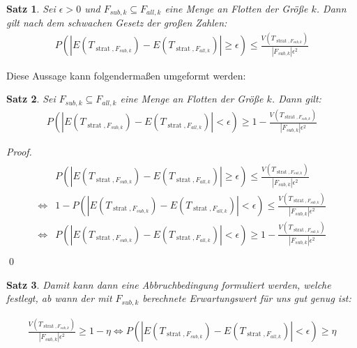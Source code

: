 \documentclass[a4paper,12pt]{llncs}
\numberwithin{equation}{section}
\newtheorem{satz}{Satz}
\DeclareMathOperator{\strat}{strat}
\begin{document}
\begin{satz}
Sei $\epsilon > 0$ und $F_{sub,k} \subseteq F_{all,k}$ eine Menge an Flotten der Größe $k$.
Dann gilt nach dem schwachen Gesetz der großen Zahlen:
\begin{align}
P(|E(T_{\strat,F_{sub,k}}) - E(T_{\strat,F_{all,k}})| \geq \epsilon) \leq \frac{V(T_{\strat,F_{sub,k}})}{|F_{sub,k}| \epsilon^2}
\nonumber
\end{align}
\end{satz}

Diese Aussage kann folgendermaßen umgeformt werden:

\begin{satz}
Sei $F_{sub,k} \subseteq F_{all,k}$ eine Menge an Flotten der Größe $k$.
Dann gilt:
\begin{align}
P(|E(T_{\strat,F_{sub,k}}) - E(T_{\strat,F_{all,k}})| < \epsilon) \geq 1 - \frac{V(T_{\strat,F_{sub,k}})}{|F_{sub,k}| \epsilon^2}
\nonumber
\end{align}
\end{satz}

\begin{proof}
\begin{align}
\begin{split}
&P(|E(T_{\strat,F_{sub,k}}) - E(T_{\strat,F_{all,k}})| \geq \epsilon) \leq \frac{V(T_{\strat,F_{sub,k}})}{|F_{sub,k}| \epsilon^2}\\
\Leftrightarrow &1 - P(|E(T_{\strat,F_{sub,k}}) - E(T_{\strat,F_{all,k}})| < \epsilon) \leq \frac{V(T_{\strat,F_{sub,k}})}{|F_{sub,k}| \epsilon^2}\\
\Leftrightarrow &P(|E(T_{\strat,F_{sub,k}}) - E(T_{\strat,F_{all,k}})| < \epsilon) \geq 1 - \frac{V(T_{\strat,F_{sub,k}})}{|F_{sub,k}| \epsilon^2}\\
\end{split}
\end{align}
\qed
\end{proof}

\begin{satz}
Damit kann dann eine Abbruchbedingung formuliert werden, welche festlegt, ab wann der mit $F_{sub,k}$ berechnete Erwartungswert für uns gut genug ist:

\begin{align}
\frac{V(T_{\strat,F_{sub,k}})}{|F_{sub,k}| \epsilon^2} \geq 1 - \eta \Leftrightarrow P(|E(T_{\strat,F_{sub,k}}) - E(T_{\strat,F_{all,k}})| < \epsilon) \geq \eta
\nonumber
\end{align}
\end{satz}
\end{document}
